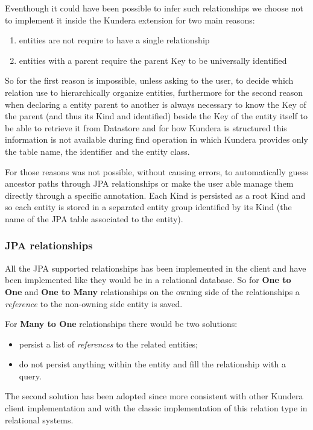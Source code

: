 \noindent Eventhough it could have been possible to infer such relationships we choose not to implement it inside the Kundera extension for two main reasons: 
\begin{enumerate}
\item entities are not require to have a single relationship
\item entities with a parent require the parent Key to be universally identified
\end{enumerate}
So for the first reason is impossible, unless asking to the user, to decide which relation use to hierarchically organize entities, furthermore for the second reason when declaring a entity parent to another is always necessary to know the Key of the parent (and thus its Kind and identified) beside the Key of the entity itself to be able to retrieve it from Datastore and for how Kundera is structured this information is not available during find operation in which Kundera provides only the table name, the identifier and the entity class.

\newparagraph For those reasons was not possible, without causing errors, to automatically guess ancestor paths through JPA relationships or make the user able manage them directly through a specific annotation.
Each Kind is persisted as a root Kind and so each entity is stored in a separated entity group identified by its Kind (the name of the JPA table associated to the entity).

\subsubsection{JPA relationships}
All the JPA supported relationships has been implemented in the client and  have been implemented like they would be in a relational database.
So for \textbf{One to One} and \textbf{One to Many} relationships on the owning side of the relationships a \textit{reference} to the non-owning side entity is saved.

\noindent For \textbf{Many to One} relationships there would be two solutions:
\begin{itemize}
\item persist a list of \textit{references} to the related entities;
\item do not persist anything within the entity and fill the relationship with a query.
\end{itemize}
The second solution has been adopted since more consistent with other Kundera client implementation and with the classic implementation of this relation type in relational systems.

